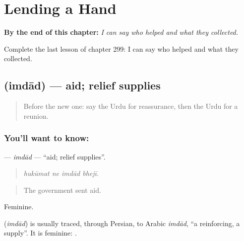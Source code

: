 
\chapter{Lending a Hand}
\label{ch:ur-lending-a-hand}

\begin{chapteropening}
\textbf{By the end of this chapter:} \emph{I can say who helped and what they collected.}

Complete the last lesson of chapter 299: I can say who helped and what they collected.
\end{chapteropening}

\section[\texorpdfstring{\ur{امداد} (imdād)}{امداد (imdād)}]{ (imdād) — aid; relief supplies}

\label{lesson:UR-C299-imdad}



\begin{quote}
Before the new one: say the Urdu for reassurance, then the Urdu for a reunion.
\end{quote}

\subsection*{You'll want to know: }
\textbf{} — \emph{imdād} — \textquotedblleft{}aid; relief supplies\textquotedblright{}.

\begin{quote}
   
\end{quote}

\begin{quote}
\emph{hukūmat ne imdād bhejī.}
\end{quote}

\begin{quote}
The government sent aid.
\end{quote}

Feminine.

\begin{cousinweb}
\textbf{} (\emph{imdād}) is usually traced, through Persian, to Arabic \emph{imdād}, \textquotedblleft{}a reinforcing, a supply\textquotedblright{}. It is feminine: \textbf{ }.
\end{cousinweb}


